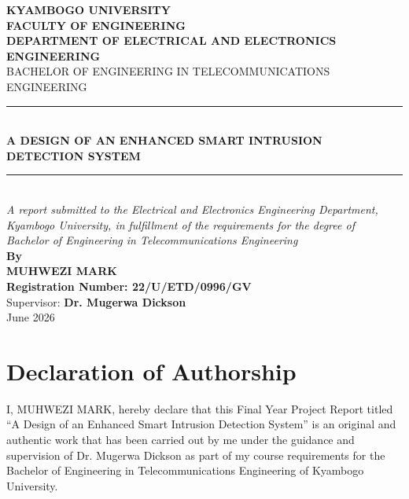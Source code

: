 \documentclass[12pt,a4paper,oneside]{report}
\begin{document}
\begin{titlepage}
  \centering

  {\large \textbf{KYAMBOGO UNIVERSITY}}\\[0.2cm]
  {\normalsize \textbf{FACULTY OF ENGINEERING}}\\[0.1cm]
  {\normalsize \textbf{DEPARTMENT OF ELECTRICAL AND ELECTRONICS ENGINEERING}}\\[0.3cm]
  {\normalsize BACHELOR OF ENGINEERING IN TELECOMMUNICATIONS ENGINEERING}\\[1.5cm]

  \rule{\linewidth}{0.5pt}\\[0.4cm]
  {\Large \textbf{A DESIGN OF AN ENHANCED SMART INTRUSION DETECTION SYSTEM}}\\[0.4cm]
  \rule{\linewidth}{0.5pt}\\[1.5cm]

  {\normalsize \textit{A report submitted to the Electrical and Electronics Engineering Department,\\
  Kyambogo University, in fulfillment of the requirements for the degree of\\
  Bachelor of Engineering in Telecommunications Engineering}}\\[1.5cm]

  {\normalsize \textbf{By}}\\[0.3cm]
  {\Large \textbf{MUHWEZI MARK}}\\[0.2cm]
  {\normalsize \textbf{Registration Number: 22/U/ETD/0996/GV}}\\[1cm]

  {\normalsize Supervisor: \textbf{Dr. Mugerwa Dickson}}\\[1.5cm]

  {\normalsize June 2026}
\end{titlepage}

\clearpage
\chapter*{Declaration of Authorship}

I, MUHWEZI MARK, hereby declare that this Final Year Project Report titled ``A Design of an Enhanced Smart Intrusion Detection System'' is an original and authentic work that has been carried out by me under the guidance and supervision of Dr. Mugerwa Dickson as part of my course requirements for the Bachelor of Engineering in Telecommunications Engineering of Kyambogo University.
\end{document}
